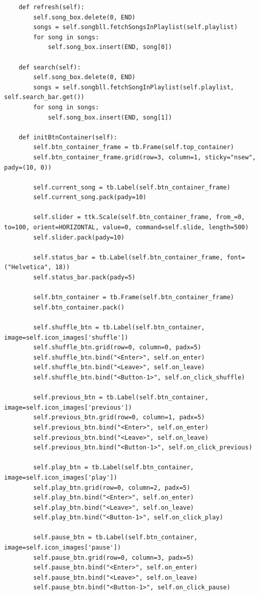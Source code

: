 \documentclass[a4paper]{article}
\begin{document}
\begin{mdframed}[hidealllines=true,backgroundcolor=magenta!10]
\begin{lstlisting}
    def refresh(self):
        self.song_box.delete(0, END)
        songs = self.songbll.fetchSongsInPlaylist(self.playlist)
        for song in songs:
            self.song_box.insert(END, song[0])

    def search(self):
        self.song_box.delete(0, END)
        songs = self.songbll.fetchSongInPlaylist(self.playlist, self.search_bar.get())
        for song in songs:
            self.song_box.insert(END, song[1])

    def initBtnContainer(self):
        self.btn_container_frame = tb.Frame(self.top_container)
        self.btn_container_frame.grid(row=3, column=1, sticky="nsew", pady=(10, 0))
        
        self.current_song = tb.Label(self.btn_container_frame)
        self.current_song.pack(pady=10)

        self.slider = ttk.Scale(self.btn_container_frame, from_=0, to=100, orient=HORIZONTAL, value=0, command=self.slide, length=500)
        self.slider.pack(pady=10)

        self.status_bar = tb.Label(self.btn_container_frame, font=("Helvetica", 18))
        self.status_bar.pack(pady=5)

        self.btn_container = tb.Frame(self.btn_container_frame)
        self.btn_container.pack()

        self.shuffle_btn = tb.Label(self.btn_container, image=self.icon_images['shuffle'])
        self.shuffle_btn.grid(row=0, column=0, padx=5)
        self.shuffle_btn.bind("<Enter>", self.on_enter)
        self.shuffle_btn.bind("<Leave>", self.on_leave)
        self.shuffle_btn.bind("<Button-1>", self.on_click_shuffle)

        self.previous_btn = tb.Label(self.btn_container, image=self.icon_images['previous'])
        self.previous_btn.grid(row=0, column=1, padx=5)
        self.previous_btn.bind("<Enter>", self.on_enter)
        self.previous_btn.bind("<Leave>", self.on_leave)
        self.previous_btn.bind("<Button-1>", self.on_click_previous)

        self.play_btn = tb.Label(self.btn_container, image=self.icon_images['play'])
        self.play_btn.grid(row=0, column=2, padx=5)
        self.play_btn.bind("<Enter>", self.on_enter)
        self.play_btn.bind("<Leave>", self.on_leave)
        self.play_btn.bind("<Button-1>", self.on_click_play)
        
        self.pause_btn = tb.Label(self.btn_container, image=self.icon_images['pause'])
        self.pause_btn.grid(row=0, column=3, padx=5)
        self.pause_btn.bind("<Enter>", self.on_enter)
        self.pause_btn.bind("<Leave>", self.on_leave)
        self.pause_btn.bind("<Button-1>", self.on_click_pause)


\end{lstlisting}
\end{mdframed}
\end{document}
